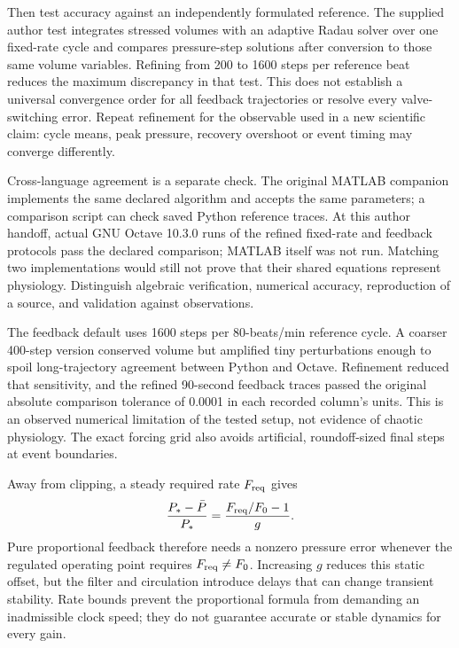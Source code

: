 \documentclass[11pt,letterpaper]{article}
\theoremstyle{definition}\newtheorem{definition}{Definition}\newtheorem{example}{Example}
\numberwithin{equation}{section}
\begin{document}
Then test accuracy against an independently formulated reference. The supplied author test integrates stressed volumes with an adaptive Radau solver over one fixed-rate cycle and compares pressure-step solutions after conversion to those same volume variables. Refining from 200 to 1600 steps per reference beat reduces the maximum discrepancy in that test. This does not establish a universal convergence order for all feedback trajectories or resolve every valve-switching error. Repeat refinement for the observable used in a new scientific claim: cycle means, peak pressure, recovery overshoot or event timing may converge differently.

Cross-language agreement is a separate check. The original MATLAB companion implements the same declared algorithm and accepts the same parameters; a comparison script can check saved Python reference traces. At this author handoff, actual GNU Octave 10.3.0 runs of the refined fixed-rate and feedback protocols pass the declared comparison; MATLAB itself was not run. Matching two implementations would still not prove that their shared equations represent physiology. Distinguish algebraic verification, numerical accuracy, reproduction of a source, and validation against observations.

The feedback default uses 1600 steps per 80-beats/min reference cycle. A coarser 400-step version conserved volume but amplified tiny perturbations enough to spoil long-trajectory agreement between Python and Octave. Refinement reduced that sensitivity, and the refined 90-second feedback traces passed the original absolute comparison tolerance of 0.0001 in each recorded column's units. This is an observed numerical limitation of the tested setup, not evidence of chaotic physiology. The exact forcing grid also avoids artificial, roundoff-sized final steps at event boundaries.

Away from clipping, a steady required rate $F_{\rm req}$ gives
\[
 \frac{P_* -\bar P}{P_*}=\frac{F_{\rm req}/F_0-1}{g}.
\]
Pure proportional feedback therefore needs a nonzero pressure error whenever the regulated operating point requires $F_{\rm req}\ne F_0$. Increasing $g$ reduces this static offset, but the filter and circulation introduce delays that can change transient stability. Rate bounds prevent the proportional formula from demanding an inadmissible clock speed; they do not guarantee accurate or stable dynamics for every gain.
\bigskip
\end{document}
